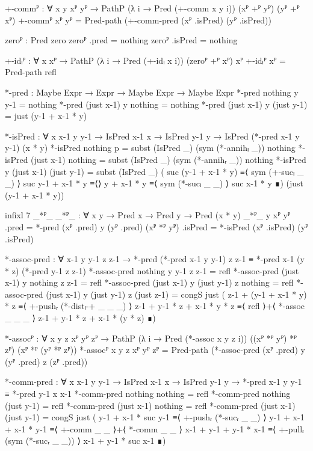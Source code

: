 \begin{code}[hide]
  +-commᴾ :
    ∀ {x y} xᴾ yᴾ → PathP (λ i → Pred (+-comm x y i)) (xᴾ +ᴾ yᴾ) (yᴾ +ᴾ xᴾ)
  +-commᴾ xᴾ yᴾ = Pred-path (+-comm-pred (xᴾ .isPred) (yᴾ .isPred))

  zeroᴾ : Pred zero
  zeroᴾ .pred = nothing
  zeroᴾ .isPred = nothing

  +-idₗᴾ : ∀ {x} xᴾ → PathP (λ i → Pred (+-idₗ x i)) (zeroᴾ +ᴾ xᴾ) xᴾ
  +-idₗᴾ xᴾ = Pred-path refl

  *-pred : Maybe Expr → Expr → Maybe Expr → Maybe Expr
  *-pred nothing y y-1 = nothing
  *-pred (just x-1) y nothing = nothing
  *-pred (just x-1) y (just y-1) = just (y-1 + x-1 * y)

  *-isPred :
    ∀ {x x-1 y y-1} →
    IsPred x-1 x → IsPred y-1 y → IsPred (*-pred x-1 y y-1) (x * y)
  *-isPred nothing p = subst (IsPred _) (sym (*-annihₗ _)) nothing
  *-isPred (just x-1) nothing = subst (IsPred _) (sym (*-annihᵣ _)) nothing
  *-isPred {y} (just x-1) (just y-1) =
    subst (IsPred _)
      ( suc (y-1 + x-1 * y) ≡⟨ sym (+-sucₗ _ _) ⟩
        suc y-1 + x-1 * y   ≡⟨⟩
        y + x-1 * y         ≡⟨ sym (*-sucₗ _ _) ⟩
        suc x-1 * y         ∎)
      (just (y-1 + x-1 * y))

  infixl 7 _*ᴾ_
  _*ᴾ_ : ∀ {x y} → Pred x → Pred y → Pred (x * y)
  _*ᴾ_ {y} xᴾ yᴾ .pred = *-pred (xᴾ .pred) y (yᴾ .pred)
  (xᴾ *ᴾ yᴾ) .isPred = *-isPred (xᴾ .isPred) (yᴾ .isPred)

  *-assoc-pred :
    ∀ x-1 y y-1 z z-1 →
    *-pred (*-pred x-1 y y-1) z z-1 ≡ *-pred x-1 (y * z) (*-pred y-1 z z-1)
  *-assoc-pred nothing y y-1 z z-1 = refl
  *-assoc-pred (just x-1) y nothing z z-1 = refl
  *-assoc-pred (just x-1) y (just y-1) z nothing = refl
  *-assoc-pred (just x-1) y (just y-1) z (just z-1) =
    congS just
      ( z-1 + (y-1 + x-1 * y) * z     ≡⟨ +-pushᵣ (*-distₗ-+ _ _ _) ⟩
        z-1 + y-1 * z + x-1 * y * z   ≡⟨ refl ⟩+⟨ *-assoc _ _ _ ⟩
        z-1 + y-1 * z + x-1 * (y * z) ∎)

  *-assocᴾ : ∀ {x y z} xᴾ yᴾ zᴾ →
    PathP (λ i → Pred (*-assoc x y z i)) ((xᴾ *ᴾ yᴾ) *ᴾ zᴾ) (xᴾ *ᴾ (yᴾ *ᴾ zᴾ))
  *-assocᴾ {x} {y} {z} xᴾ yᴾ zᴾ =
    Pred-path (*-assoc-pred (xᴾ .pred) y (yᴾ .pred) z (zᴾ .pred))

  *-comm-pred :
    ∀ {x x-1 y y-1} → IsPred x-1 x → IsPred y-1 y →
    *-pred x-1 y y-1 ≡ *-pred y-1 x x-1
  *-comm-pred nothing nothing = refl
  *-comm-pred nothing (just y-1) = refl
  *-comm-pred (just x-1) nothing = refl
  *-comm-pred (just x-1) (just y-1) =
    congS just
      ( y-1 + x-1 * suc y-1   ≡⟨ +-pushᵣ (*-sucᵣ _ _) ⟩
        y-1 + x-1 + x-1 * y-1 ≡⟨ +-comm _ _ ⟩+⟨ *-comm _ _ ⟩
        x-1 + y-1 + y-1 * x-1 ≡⟨ +-pullᵣ (sym (*-sucᵣ _ _)) ⟩
        x-1 + y-1 * suc x-1 ∎)


\end{code}
